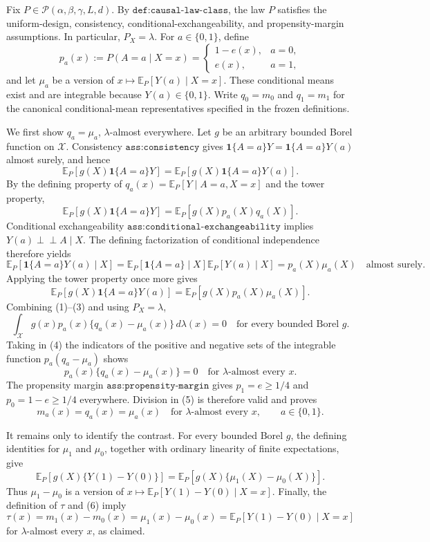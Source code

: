Fix \(P\in\mathcal P(\alpha,\beta,\gamma,L,d)\).  By
\(\texttt{def:causal-law-class}\), the law \(P\) satisfies the uniform-design,
consistency, conditional-exchangeability, and propensity-margin assumptions.  In
particular, \(P_X=\lambda\).  For \(a\in\{0,1\}\), define
\[
 p_a(x):=P(A=a\mid X=x)
 =\begin{cases}1-e(x),&a=0,\\ e(x),&a=1,\end{cases}
\]
and let \(\mu_a\) be a version of
\(x\mapsto\mathbb E_P[Y(a)\mid X=x]\).  These conditional means exist and are
integrable because \(Y(a)\in\{0,1\}\).  Write \(q_0=m_0\) and \(q_1=m_1\) for
the canonical conditional-mean representatives specified in the frozen
definitions.

We first show \(q_a=\mu_a\), \(\lambda\)-almost everywhere.  Let \(g\) be an
arbitrary bounded Borel function on \(\mathcal X\).  Consistency
\(\texttt{ass:consistency}\) gives
\(\mathbf 1\{A=a\}Y=\mathbf 1\{A=a\}Y(a)\) almost surely, and hence
\[
 \mathbb E_P\!\left[g(X)\mathbf 1\{A=a\}Y\right]
 =\mathbb E_P\!\left[g(X)\mathbf 1\{A=a\}Y(a)\right]. \tag{1}
\]
By the defining property of \(q_a(x)=\mathbb E_P[Y\mid A=a,X=x]\) and the
tower property,
\[
 \mathbb E_P\!\left[g(X)\mathbf 1\{A=a\}Y\right]
 =\mathbb E_P\!\left[g(X)p_a(X)q_a(X)\right]. \tag{2}
\]
Conditional exchangeability
\(\texttt{ass:conditional-exchangeability}\) implies
\(Y(a)\mathrel{\perp\!\!\!\perp}A\mid X\).  The defining factorization of
conditional independence therefore yields
\[
 \mathbb E_P\!\left[\mathbf 1\{A=a\}Y(a)\mid X\right]
 =\mathbb E_P\!\left[\mathbf 1\{A=a\}\mid X\right]
   \mathbb E_P[Y(a)\mid X]
 =p_a(X)\mu_a(X)
 \quad\text{almost surely}.
\]
Applying the tower property once more gives
\[
 \mathbb E_P\!\left[g(X)\mathbf 1\{A=a\}Y(a)\right]
 =\mathbb E_P\!\left[g(X)p_a(X)\mu_a(X)\right]. \tag{3}
\]
Combining (1)--(3) and using \(P_X=\lambda\),
\[
 \int_{\mathcal X}g(x)p_a(x)\{q_a(x)-\mu_a(x)\}\,d\lambda(x)=0
 \quad\text{for every bounded Borel }g. \tag{4}
\]
Taking in (4) the indicators of the positive and negative sets of the
integrable function \(p_a(q_a-\mu_a)\) shows
\[
 p_a(x)\{q_a(x)-\mu_a(x)\}=0
 \quad\text{for \(\lambda\)-almost every }x. \tag{5}
\]
The propensity margin \(\texttt{ass:propensity-margin}\) gives
\(p_1=e\ge 1/4\) and \(p_0=1-e\ge 1/4\) everywhere.  Division in (5) is
therefore valid and proves
\[
 m_a(x)=q_a(x)=\mu_a(x)
 \quad\text{for \(\lambda\)-almost every }x,
 \qquad a\in\{0,1\}. \tag{6}
\]

It remains only to identify the contrast.  For every bounded Borel \(g\), the
defining identities for \(\mu_1\) and \(\mu_0\), together with ordinary
linearity of finite expectations, give
\[
 \mathbb E_P[g(X)\{Y(1)-Y(0)\}]
 =\mathbb E_P[g(X)\{\mu_1(X)-\mu_0(X)\}].
\]
Thus \(\mu_1-\mu_0\) is a version of
\(x\mapsto\mathbb E_P[Y(1)-Y(0)\mid X=x]\).  Finally, the definition of
\(\tau\) and (6) imply
\[
 \tau(x)=m_1(x)-m_0(x)
 =\mu_1(x)-\mu_0(x)
 =\mathbb E_P[Y(1)-Y(0)\mid X=x]
\]
for \(\lambda\)-almost every \(x\), as claimed.

